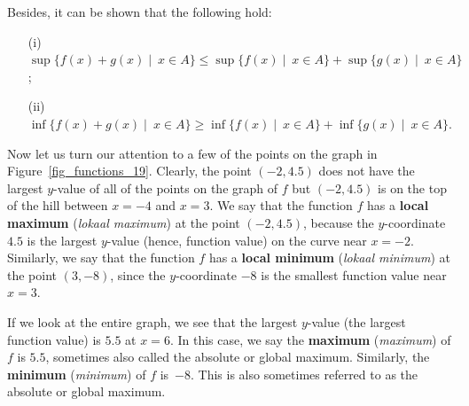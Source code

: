 Besides, it can be shown that the following hold: 
\begin{enumerate}
\item[(i)]  $\sup\{f(x)+g(x)\mid ~x \in A\} \leq \sup\{f(x)\mid  ~x \in A\} + \sup\{g(x)\mid ~x \in A\}$; 
\item[(ii)] $\inf\{f(x)+g(x)\mid  ~x \in A\} \geq \inf\{f(x)\mid  ~x \in A\} + \inf\{g(x)\mid ~x \in A\}$.
\end{enumerate}


\fi
\fi







\ifcourse
	\checkoddpage
{}
 \fi

Now let us turn our attention to a few of the points on the graph in Figure~\ref{fig_functions_19}.  Clearly, the point $(-2, 4.5)$ does not have the largest $y$-value of all of the points on the graph of $f$ but $(-2, 4.5)$ is on the top of the hill between $x = -4$ and $x = 3$.  We say that the function $f$ has a \textbf{local maximum} (\textit{lokaal maximum}) at the point $(-2,4.5)$, because the $y$-coordinate $4.5$ is the largest $y$-value (hence, function value) on the curve near $x=-2$.  Similarly, we say that the function $f$ has a \textbf{local minimum} (\textit{lokaal minimum}) at the point $(3,-8)$, since the $y$-coordinate $-8$ is the smallest function value near $x=3$.

If we look at the entire graph, we see that the largest $y$-value (the largest function value) is $5.5$ at $x=6$.  In this case, we say the \textbf{maximum} (\textit{maximum}) of $f$ is $5.5$, sometimes also called the absolute or global maximum. Similarly, the \textbf{minimum} (\textit{minimum}) of $f$ is~$-8$.  This is also sometimes referred to as the absolute or global maximum.  

